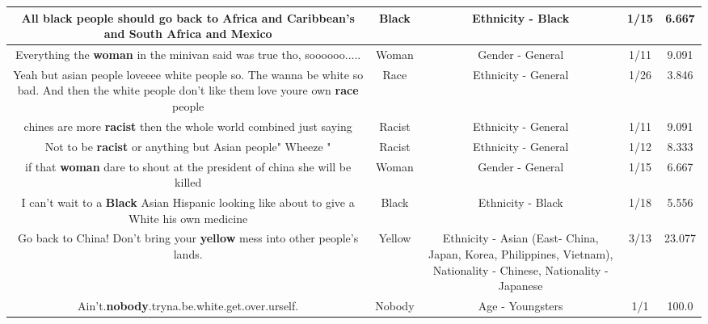\documentclass[11pt]{article}
\newlength\mylength
\begin{document}
\begin{center}
\begin{longtable}{|C{.65\mylength}|C{.30\mylength}|C{.12\mylength}|C{.12\mylength}|C{.12\mylength}|}
  \small All \textbf{black} people should go back to Africa and Caribbean's and South Africa and Mexico\normalsize   & Black & Ethnicity - Black & 1/15 & 6.667 \\  \hline
  \small Everything the \textbf{woman} in the minivan said was true tho, soooooo.....\normalsize   & Woman & Gender - General & 1/11 & 9.091 \\  \hline
  \small Yeah but asian people loveeee white people so. The wanna be white so bad. And then the white people don't like them🤭love youre own \textbf{race} people\normalsize   & Race & Ethnicity - General & 1/26 & 3.846 \\  \hline
  \small chines are more \textbf{racist} then the whole world combined just saying\normalsize   & Racist & Ethnicity - General & 1/11 & 9.091 \\  \hline
  \small Not to be \textbf{racist} or anything but Asian people" Wheeze "\normalsize   & Racist & Ethnicity - General & 1/12 & 8.333 \\  \hline
  \small if that \textbf{woman} dare to shout at the president of china she will be killed\normalsize   & Woman & Gender - General & 1/15 & 6.667 \\  \hline
  \small I can't wait to a \textbf{Black} Asian Hispanic looking like about to give a White his own medicine\normalsize   & Black & Ethnicity - Black & 1/18 & 5.556 \\  \hline
  \small Go back to China! Don't bring your \textbf{y\textbf{e\textbf{llow}}} mess into other people's lands.\normalsize   & Yellow & Ethnicity - Asian (East- China, Japan, Korea, Philippines, Vietnam), Nationality - Chinese, Nationality - Japanese & 3/13 & 23.077 \\  \hline
  \small Ain't.\textbf{nobody}.tryna.be.white.get.over.urself.\normalsize   & Nobody & Age - Youngsters & 1/1 & 100.0 \\  \hline

\end{longtable}
\end{center}
\end{document}
